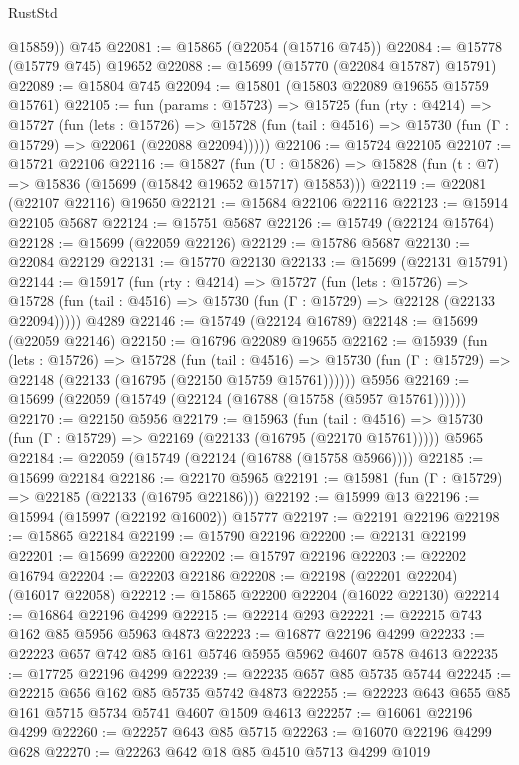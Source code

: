 \begin{lexlean}{RustStd}
\begin{coremodule}
        @15859))
    @745
@22081 := @15865 (@22054 (@15716 @745))
@22084 := @15778 (@15779 @745) @19652
@22088 := @15699 (@15770 (@22084 @15787) @15791)
@22089 := @15804 @745
@22094 := @15801 (@15803 @22089 @19655 @15759 @15761)
@22105 := fun (params : @15723) =>
  @15725
    (fun (rty : @4214) =>
    @15727
      (fun (lets : @15726) =>
      @15728 (fun (tail : @4516) => @15730 (fun (Γ : @15729) => @22061 (@22088 @22094)))))
@22106 := @15724 @22105
@22107 := @15721 @22106
@22116 := @15827
    (fun (U : @15826) => @15828 (fun (t : @7) => @15836 (@15699 (@15842 @19652 @15717) @15853)))
@22119 := @22081 (@22107 @22116) @19650
@22121 := @15684 @22106 @22116
@22123 := @15914 @22105 @5687
@22124 := @15751 @5687
@22126 := @15749 (@22124 @15764)
@22128 := @15699 (@22059 @22126)
@22129 := @15786 @5687
@22130 := @22084 @22129
@22131 := @15770 @22130
@22133 := @15699 (@22131 @15791)
@22144 := @15917
    (fun (rty : @4214) =>
    @15727
      (fun (lets : @15726) =>
      @15728 (fun (tail : @4516) => @15730 (fun (Γ : @15729) => @22128 (@22133 @22094)))))
    @4289
@22146 := @15749 (@22124 @16789)
@22148 := @15699 (@22059 @22146)
@22150 := @16796 @22089 @19655
@22162 := @15939
    (fun (lets : @15726) =>
    @15728
      (fun (tail : @4516) =>
      @15730 (fun (Γ : @15729) => @22148 (@22133 (@16795 (@22150 @15759 @15761))))))
    @5956
@22169 := @15699 (@22059 (@15749 (@22124 (@16788 (@15758 (@5957 @15761))))))
@22170 := @22150 @5956
@22179 := @15963
    (fun (tail : @4516) => @15730 (fun (Γ : @15729) => @22169 (@22133 (@16795 (@22170 @15761)))))
    @5965
@22184 := @22059 (@15749 (@22124 (@16788 (@15758 @5966))))
@22185 := @15699 @22184
@22186 := @22170 @5965
@22191 := @15981 (fun (Γ : @15729) => @22185 (@22133 (@16795 @22186)))
@22192 := @15999 @13
@22196 := @15994 (@15997 (@22192 @16002)) @15777
@22197 := @22191 @22196
@22198 := @15865 @22184
@22199 := @15790 @22196
@22200 := @22131 @22199
@22201 := @15699 @22200
@22202 := @15797 @22196
@22203 := @22202 @16794
@22204 := @22203 @22186
@22208 := @22198 (@22201 @22204) (@16017 @22058)
@22212 := @15865 @22200 @22204 (@16022 @22130)
@22214 := @16864 @22196 @4299
@22215 := @22214 @293
@22221 := @22215 @743 @162 @85 @5956 @5963 @4873
@22223 := @16877 @22196 @4299
@22233 := @22223 @657 @742 @85 @161 @5746 @5955 @5962 @4607 @578 @4613
@22235 := @17725 @22196 @4299
@22239 := @22235 @657 @85 @5735 @5744
@22245 := @22215 @656 @162 @85 @5735 @5742 @4873
@22255 := @22223 @643 @655 @85 @161 @5715 @5734 @5741 @4607 @1509 @4613
@22257 := @16061 @22196 @4299
@22260 := @22257 @643 @85 @5715
@22263 := @16070 @22196 @4299 @628
@22270 := @22263 @642 @18 @85 @4510 @5713 @4299 @1019

\end{coremodule}
\end{lexlean}
